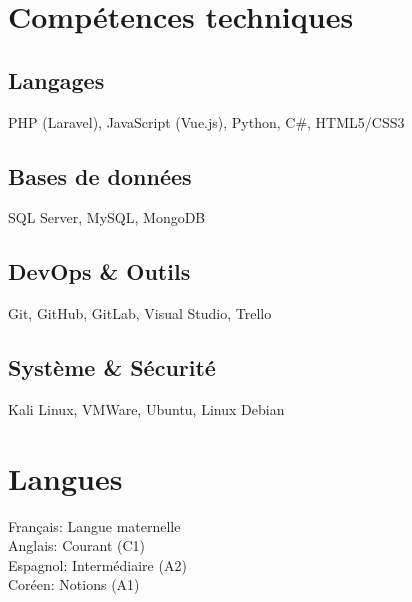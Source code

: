 \documentclass[]{deedy-resume-reversed}
\newcommand{\compLangages}{PHP (Laravel), JavaScript (Vue.js), Python, C\#, HTML5/CSS3}
\newcommand{\compBDD}{SQL Server, MySQL, MongoDB}
\newcommand{\compDevOps}{Git, GitHub, GitLab, Visual Studio, Trello}
\newcommand{\compSecurity}{Kali Linux, VMWare, Ubuntu, Linux Debian}
\newcommand{\langueUn}{Français: Langue maternelle}
\newcommand{\langueDeux}{Anglais: Courant (C1)}
\newcommand{\langueTrois}{Espagnol: Intermédiaire (A2)}
\newcommand{\langueQuatre}{Coréen: Notions (A1)}
\begin{document}
\hfill
\begin{minipage}[t]{0.33\textwidth}

\section{Compétences techniques}
\subsection{Langages}
\compLangages
\sectionsep

\subsection{Bases de données}
\compBDD
\sectionsep

\subsection{DevOps \& Outils}
\compDevOps
\sectionsep

\subsection{Système \& Sécurité}
\compSecurity
\sectionsep

\section{Langues}
\langueUn \\
\langueDeux \\
\langueTrois \\
\langueQuatre
\sectionsep

\end{minipage}
\end{document}
